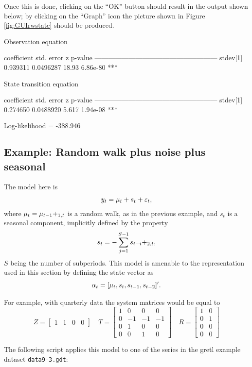 Once this is done, clicking on the ``OK'' button should result in the
output shown below; by clicking on the ``Graph'' icon the picture
shown in Figure \ref{fig:GUIrwstate} should be produced.

\begin{code}
Observation equation

             coefficient   std. error     z     p-value
  ------------------------------------------------------
  stdev[1]    0.939311     0.0496287    18.93   6.86e-80 ***


State transition equation

             coefficient   std. error     z     p-value
  ------------------------------------------------------
  stdev[1]    0.274650     0.0488920    5.617   1.94e-08 ***

  Log-likelihood = -388.946
\end{code}

\subsection{Example: Random walk plus noise plus seasonal}

The model here is
\[
  y_t = \mu_t + s_t + \varepsilon_t,
\]
where $\mu_t = \mu_{t-1} + \relax_{1,t}$ is a random walk, as in the
previous example, and $s_t$ is a seasonal component, implicitly
defined by the property
\[
  s_t = -\sum_{j=1}^{S-1} s_{t-i} + \relax_{2,t},
\]
$S$ being the number of subperiods. This model is amenable to the
representation used in this section by defining the state vector as
\[
  \alpha_t = [ \mu_t, s_t, s_{t-1}, s_{t-2}]' .
\]

For example, with quarterly data the system matrices would be equal
to
\[
  Z = \begin{bmatrix}  1 & 1 & 0 & 0  \end{bmatrix}
  \quad
  T = \begin{bmatrix}
    1 & 0 & 0 & 0 \\
    0 & -1 & -1 & -1 \\
    0 & 1 & 0 & 0 \\
    0 & 0 & 1 & 0
  \end{bmatrix}
  \quad
  R = \begin{bmatrix}  1 & 0 \\ 0 & 1 \\ 0 & 0 \\ 0 & 0   \end{bmatrix}
\]

The following script applies this model to one of the series in the
gretl example dataset \texttt{data9-3.gdt}:

